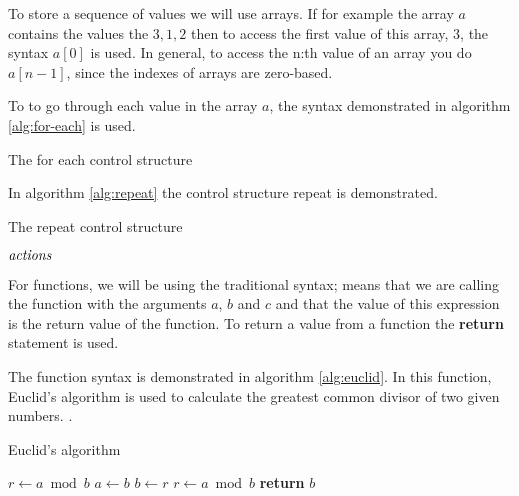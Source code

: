 To store a sequence of values we will use arrays. If for example the
array $a$ contains the values the $3,1,2$ then to access the first
value of this array, $3$, the syntax $a[0]$ is used. In general, to
access the n:th value of an array you do $a[n-1]$, since the indexes
of arrays are zero-based.

To to go through each value in the array $a$, the syntax demonstrated
in algorithm \ref{alg:for-each} is used.

\begin{algorithm}[H]
  \caption{The for each control structure}
  \label{alg:for-each}
  \begin{algorithmic}[1]
    \EndForEach
  \end{algorithmic}
\end{algorithm}

In algorithm \ref{alg:repeat} the control structure repeat is
demonstrated.

\begin{algorithm}[H]
  \caption{The repeat control structure}
  \label{alg:repeat}
  \begin{algorithmic}[1]
    \State $\mathit{actions}$ 
    \EndRepeatn
  \end{algorithmic}
\end{algorithm}

For functions, we will be using the traditional syntax;
 means that we are calling the function
 with the arguments $a$, $b$ and $c$ and that the value
of this expression is the return value of the function. To return a
value from a function the \textbf{return} statement is used.

The function syntax is demonstrated in algorithm \ref{alg:euclid}. In
this function, Euclid's algorithm is used to calculate the greatest
common divisor of two given numbers.
\cite{cormen2009introduction_to_algo,weisstein:_euclid_algor}.

\begin{algorithm}
  \caption{Euclid's algorithm}
  \label{alg:euclid}
  \begin{algorithmic}[1]
    \State $r\gets a\bmod b$
    \State $a\gets b$
    \State $b\gets r$
    \State $r\gets a\bmod b$
    \EndWhile
    \State \textbf{return} $b$
    \EndProcedure
  \end{algorithmic}
\end{algorithm}

